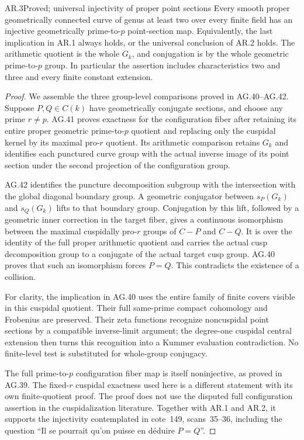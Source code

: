 \begin{claim}{AR.3}{Proved; universal injectivity of proper point sections}
\label{clm:ARuniversalpointsections}
Every smooth proper geometrically connected curve of genus at least two
over every finite field has an injective geometrically prime-to-$p$
point-section map.  Equivalently, the last implication in AR.1 always
holds, or the universal conclusion of AR.2 holds.
The arithmetic quotient is the whole $G_k$, and conjugation is by the
whole geometric prime-to-$p$ group.  In particular the assertion includes
characteristics two and three and every finite constant extension.
\end{claim}
\begin{proof}
We assemble the three group-level comparisons proved in AG.40--AG.42.
Suppose $P,Q\in C(k)$ have geometrically conjugate sections, and choose
any prime $r\ne p$.  AG.41 proves exactness for the configuration fiber
after retaining its entire proper geometric prime-to-$p$ quotient and
replacing only the cuspidal kernel by its maximal pro-$r$ quotient.
Its arithmetic comparison retains $G_k$ and identifies each punctured
curve group with the actual inverse image of its point section under
the second projection of the configuration group.

AG.42 identifies the puncture decomposition subgroup with the
intersection with the global diagonal boundary group.  A geometric
conjugator between $s_P(G_k)$ and $s_Q(G_k)$ lifts to that boundary
group.  Conjugation by this lift, followed by a geometric inner
correction in the target fiber, gives a continuous isomorphism
between the maximal cuspidally pro-$r$ groups of $C-P$ and $C-Q$.
It is over the identity of the full proper arithmetic quotient and
carries the actual cusp decomposition group to a conjugate of the
actual target cusp group.  AG.40 proves that such an isomorphism
forces $P=Q$.  This contradicts the existence of a collision.

For clarity, the implication in AG.40 uses the entire family of finite
covers visible in this cuspidal quotient.  Their full same-prime
compact cohomology and Frobenius are preserved.  Their zeta functions
recognize noncuspidal point sections by a compatible inverse-limit
argument; the degree-one cuspidal central extension then turns this
recognition into a Kummer evaluation contradiction.  No finite-level
test is substituted for whole-group conjugacy.

The full prime-to-$p$ configuration fiber map is itself noninjective,
as proved in AG.39.  The fixed-$r$ cuspidal exactness used here is a
different statement with its own finite-quotient proof.  The proof
does not use the disputed full configuration assertion in the
cuspidalization literature.  Together with AR.1 and AR.2, it supports
the injectivity contemplated in cote~149, scans~35--36, including
the question ``Il se pourrait qu'on puisse en d\'eduire $P=Q$''.
\end{proof}
